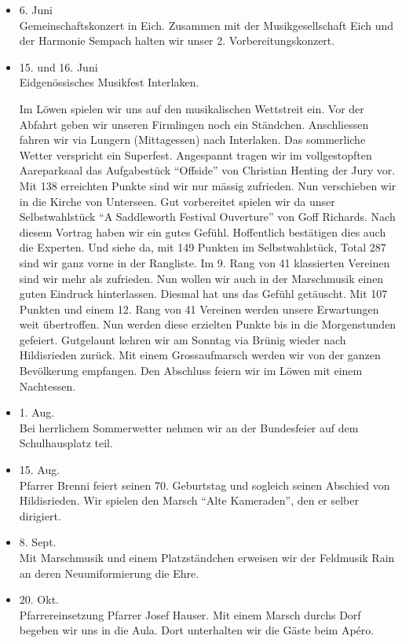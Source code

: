 \begin{history}
\begin{itemize}
        \item[]6. Juni\\
        Gemeinschaftskonzert in Eich. Zusammen mit der Musikgesellschaft Eich
        und der Harmonie Sempach halten wir unser 2. Vorbereitungskonzert.

        \item[]15. und 16. Juni\\
        Eidgenössisches Musikfest Interlaken.

        Im Löwen spielen wir uns auf den musikalischen Wettstreit ein. Vor der
        Abfahrt geben wir unseren Firmlingen noch ein Ständchen. Anschliessen
        fahren wir via Lungern (Mittagessen) nach Interlaken. Das sommerliche
        Wetter verspricht ein Superfest. Angespannt tragen wir im vollgestopften
        Aareparksaal das Aufgabestück \enquote{Offside} von Christian Henting
        der Jury vor. Mit 138 erreichten Punkte sind wir nur mässig zufrieden.
        Nun verschieben wir in die Kirche von Unterseen. Gut vorbereitet spielen
        wir da unser Selbstwahlstück \enquote{A Saddleworth Festival Ouverture}
        von Goff Richards. Nach diesem Vortrag haben wir ein gutes Gefühl.
        Hoffentlich bestätigen dies auch die Experten. Und siehe da, mit 149
        Punkten im Selbstwahlstück, Total 287 sind wir ganz vorne in der
        Rangliste. Im 9. Rang von 41 klassierten Vereinen sind wir mehr als
        zufrieden. Nun wollen wir auch in der Marschmusik einen guten Eindruck
        hinterlassen. Diesmal hat uns das Gefühl getäuscht. Mit 107 Punkten und
        einem 12. Rang von 41 Vereinen werden unsere Erwartungen weit
        übertroffen. Nun werden diese erzielten Punkte bis in die Morgenstunden
        gefeiert. Gutgelaunt kehren wir am Sonntag via Brünig wieder nach
        Hildisrieden zurück. Mit einem Grossaufmarsch werden wir von der ganzen
        Bevölkerung empfangen. Den Abschluss feiern wir im Löwen mit einem
        Nachtessen.

        \item[]1. Aug.\\
        Bei herrlichem Sommerwetter nehmen wir an der Bundesfeier auf dem
        Schulhausplatz teil.

        \item[]15. Aug.\\
        Pfarrer Brenni feiert seinen 70. Geburtstag und sogleich seinen Abschied
        von Hildisrieden. Wir spielen den Marsch \enquote{Alte Kameraden}, den
        er selber dirigiert.

        \item[]8. Sept.\\
        Mit Marschmusik und einem Platzständchen erweisen wir der Feldmusik Rain
        an deren Neuuniformierung die Ehre.

        \item[]20. Okt.\\
        Pfarrereinsetzung Pfarrer Josef Hauser. Mit einem Marsch durchs Dorf
        begeben wir uns in die Aula. Dort unterhalten wir die Gäste beim Apéro.

    \end{itemize}

\end{history}
